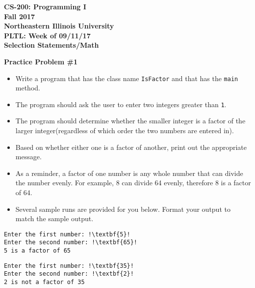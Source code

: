 \documentclass[12pt]{article}
\begin{document}
\begin{center}
	\textbf{CS-200: Programming I}\\
	\textbf{Fall 2017}\\
	\textbf{Northeastern Illinois University}\\
	\textbf{PLTL: Week of 09/11/17}\\
	\textbf{Selection Statements/Math}
\end{center}

\noindent\textbf{Practice Problem \#1}
\begin{itemize}
	\item Write a program that has the class name \texttt{IsFactor} and that has the \texttt{main} method.
	\item The program should ask the user to enter two integers greater than \texttt{1}.
	\item The program should determine whether the smaller integer is a factor of the larger integer(regardless of which order the two numbers are entered in). 
	\item Based on whether either one is a factor of another, print out the appropriate message.
	\item As a reminder, a factor of one number is any whole number that can divide the number evenly. For example, 8 can divide 64 evenly, therefore 8 is a factor of 64. 
	\item Several sample runs are provided for you below. Format your output to match the sample output.
\end{itemize}
\begin{center}
\begin{minipage}{4.5cm}
\begin{lstlisting}[escapechar=!]
Enter the first number: !\textbf{5}!
Enter the second number: !\textbf{65}!
5 is a factor of 65
\end{lstlisting}
\end{minipage}
\hspace*{0.5cm}
\begin{minipage}{4.5cm}
\begin{lstlisting}[escapechar=!]
Enter the first number: !\textbf{35}!
Enter the second number: !\textbf{2}!
2 is not a factor of 35
\end{lstlisting}
\end{minipage}
\end{center}
\end{document}
